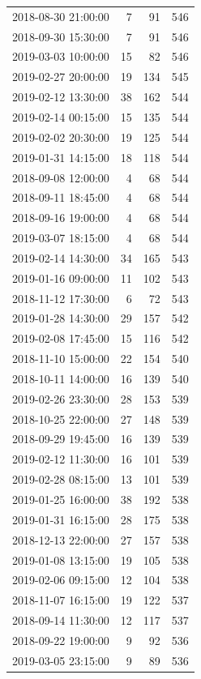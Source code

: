 \begin{tabular}{lrrr}
2018-08-30 21:00:00 & 7 & 91 & 546 \\
2018-09-30 15:30:00 & 7 & 91 & 546 \\
2019-03-03 10:00:00 & 15 & 82 & 546 \\
2019-02-27 20:00:00 & 19 & 134 & 545 \\
2019-02-12 13:30:00 & 38 & 162 & 544 \\
2019-02-14 00:15:00 & 15 & 135 & 544 \\
2019-02-02 20:30:00 & 19 & 125 & 544 \\
2019-01-31 14:15:00 & 18 & 118 & 544 \\
2018-09-08 12:00:00 & 4 & 68 & 544 \\
2018-09-11 18:45:00 & 4 & 68 & 544 \\
2018-09-16 19:00:00 & 4 & 68 & 544 \\
2019-03-07 18:15:00 & 4 & 68 & 544 \\
2019-02-14 14:30:00 & 34 & 165 & 543 \\
2019-01-16 09:00:00 & 11 & 102 & 543 \\
2018-11-12 17:30:00 & 6 & 72 & 543 \\
2019-01-28 14:30:00 & 29 & 157 & 542 \\
2019-02-08 17:45:00 & 15 & 116 & 542 \\
2018-11-10 15:00:00 & 22 & 154 & 540 \\
2018-10-11 14:00:00 & 16 & 139 & 540 \\
2019-02-26 23:30:00 & 28 & 153 & 539 \\
2018-10-25 22:00:00 & 27 & 148 & 539 \\
2018-09-29 19:45:00 & 16 & 139 & 539 \\
2019-02-12 11:30:00 & 16 & 101 & 539 \\
2019-02-28 08:15:00 & 13 & 101 & 539 \\
2019-01-25 16:00:00 & 38 & 192 & 538 \\
2019-01-31 16:15:00 & 28 & 175 & 538 \\
2018-12-13 22:00:00 & 27 & 157 & 538 \\
2019-01-08 13:15:00 & 19 & 105 & 538 \\
2019-02-06 09:15:00 & 12 & 104 & 538 \\
2018-11-07 16:15:00 & 19 & 122 & 537 \\
2018-09-14 11:30:00 & 12 & 117 & 537 \\
2018-09-22 19:00:00 & 9 & 92 & 536 \\
2019-03-05 23:15:00 & 9 & 89 & 536 \\

\end{tabular}
